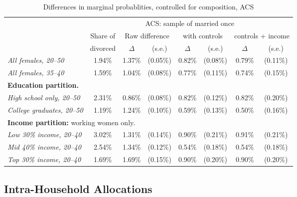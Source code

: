 \documentclass[12pt,letter]{article}
\begin{document}
\begin{table}
\begin{center}
\begin{tabular}{|l|c||c|c|c|c|c|c|}\cline{2-8}
\multicolumn{1}{c|}{} & \multicolumn{7}{c|}{ACS: sample of married once}\\\cline{2-8}
\multicolumn{1}{c|}{} & \small Share of &\multicolumn{2}{c|}{\small Raw difference} & \multicolumn{2}{c|}{\small with controls} & \multicolumn{2}{c|}{\small controls + income} \\ \cline{3-8}
\multicolumn{1}{c|}{} & \small divorced & $\Delta$ & (s.e.) & $\Delta$ & (s.e.) & $\Delta$ & (s.e.) \\  \hline
\textit{All females, 20--50} & 1.94\% &  1.37\% &  (0.05\%) &  0.82\% &  (0.08\%) &  0.79\%  &  (0.11\%) \\
\textit{All females, 35--40} &   1.59\% &  1.04\% &  (0.08\%) &   0.77\% &  (0.11\%)  &  0.74\%   &  (0.15\%) \\\hline\hline
\multicolumn{8}{|p{0.9\linewidth}|}{\footnotesize \textbf{Education partition.}}\\\hline
\textit{High school only, 20--50} & 2.31\% &  0.86\% &  (0.08\%) &   0.82\% &  (0.12\%)  &  0.82\%  &   (0.20\%) \\
\textit{College graduates, 20--50} & 1.19\% &  1.24\% & (0.10\%) &   0.59\% &   (0.13\%)  &  0.50\% &    (0.16\%) \\\hline\hline
\multicolumn{8}{|p{0.9\linewidth}|}{\footnotesize \textbf{Income partition:} working women only.}\\\hline
\textit{Low 30\% income, 20--40} &  3.02\% &  1.31\% &  (0.14\%) &   0.90\% &  (0.21\%) &   0.91\%  &   (0.21\%) \\
\textit{Mid 40\% income, 20--40} &  2.54\% &  1.34\% &  (0.12\%) &   0.54\%  & (0.18\%) &   0.54\% &    (0.18\%) \\
\textit{Top 30\% income, 20--40} & 1.69\% &  1.69\% &   (0.15\%) &   0.90\%  & (0.20\%) &   0.90\% &    (0.20\%) \\
\hline
\end{tabular}
\caption{Differences in marginal probablities, controlled for composition, ACS\label{diff-contr-marginal}}
\end{center}
\end{table}

\subsection{Intra-Household Allocations}
\end{document}
